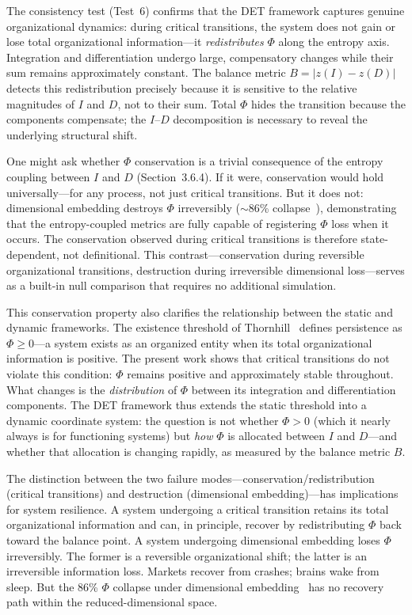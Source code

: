 \documentclass[aip,cha,reprint,amsmath,amssymb,final,floatfix]{revtex4-2}
\begin{document}
The consistency test (Test~6) confirms that the DET framework captures genuine organizational dynamics: during critical transitions, the system does not gain or lose total organizational information---it \emph{redistributes} $\Phi$ along the entropy axis. Integration and differentiation undergo large, compensatory changes while their sum remains approximately constant. The balance metric $B = |z(I) - z(D)|$ detects this redistribution precisely because it is sensitive to the relative magnitudes of $I$ and $D$, not to their sum. Total $\Phi$ hides the transition because the components compensate; the $I$--$D$ decomposition is necessary to reveal the underlying structural shift.

One might ask whether $\Phi$ conservation is a trivial consequence of the entropy coupling between $I$ and $D$ (Section~3.6.4). If it were, conservation would hold universally---for any process, not just critical transitions. But it does not: dimensional embedding destroys $\Phi$ irreversibly (${\sim}86$\% collapse~\cite{thornhill2026b,thornhill2026c}), demonstrating that the entropy-coupled metrics are fully capable of registering $\Phi$ loss when it occurs. The conservation observed during critical transitions is therefore state-dependent, not definitional. This contrast---conservation during reversible organizational transitions, destruction during irreversible dimensional loss---serves as a built-in null comparison that requires no additional simulation.

This conservation property also clarifies the relationship between the static and dynamic frameworks. The existence threshold of Thornhill~\cite{thornhill2026a} defines persistence as $\Phi \geq 0$---a system exists as an organized entity when its total organizational information is positive. The present work shows that critical transitions do not violate this condition: $\Phi$ remains positive and approximately stable throughout. What changes is the \emph{distribution} of $\Phi$ between its integration and differentiation components. The DET framework thus extends the static threshold into a dynamic coordinate system: the question is not whether $\Phi > 0$ (which it nearly always is for functioning systems) but \emph{how} $\Phi$ is allocated between $I$ and $D$---and whether that allocation is changing rapidly, as measured by the balance metric $B$.

The distinction between the two failure modes---conservation/redistribution (critical transitions) and destruction (dimensional embedding)---has implications for system resilience. A system undergoing a critical transition retains its total organizational information and can, in principle, recover by redistributing $\Phi$ back toward the balance point. A system undergoing dimensional embedding loses $\Phi$ irreversibly. The former is a reversible organizational shift; the latter is an irreversible information loss. Markets recover from crashes; brains wake from sleep. But the 86\% $\Phi$ collapse under dimensional embedding~\cite{thornhill2026b,thornhill2026c} has no recovery path within the reduced-dimensional space.
\end{document}

